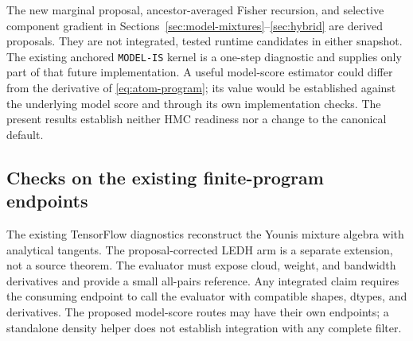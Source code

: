\documentclass[11pt]{article}
\begin{document}
The new marginal proposal, ancestor-averaged Fisher recursion, and selective
component gradient in Sections~\ref{sec:model-mixtures}--\ref{sec:hybrid}
are derived proposals. They are not integrated, tested runtime candidates in
either snapshot. The existing anchored \texttt{MODEL-IS} kernel is a
one-step diagnostic and supplies only part of that future implementation.
A useful model-score estimator could differ from the derivative of
\eqref{eq:atom-program}; its value would be established against the underlying
model score and through its own implementation checks. The present results
establish neither HMC readiness nor a change to the canonical default.

\subsection{Checks on the existing finite-program endpoints}

The existing TensorFlow diagnostics reconstruct the Younis mixture
algebra with analytical tangents.  The proposal-corrected LEDH arm is a
separate extension, not a source theorem.  The evaluator must expose cloud,
weight, and bandwidth derivatives and provide a small all-pairs reference.  Any integrated claim requires the consuming endpoint to call the evaluator
with compatible shapes, dtypes, and derivatives. The proposed model-score
routes may have their own endpoints; a standalone density helper does not
establish integration with any complete filter.
\end{document}
